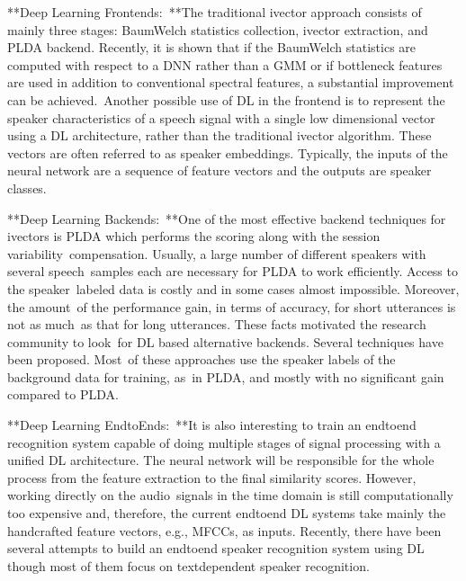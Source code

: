 \documentclass[letterpaper,10pt,english]{jupyterBook}
\begin{document}
\sphinxAtStartPar
**Deep Learning Frontends: **The traditional i\sphinxhyphen{}vector approach consists
of mainly three stages: Baum\sphinxhyphen{}Welch statistics collection, i\sphinxhyphen{}vector
extraction, and PLDA backend. Recently, it is shown that if the
Baum\sphinxhyphen{}Welch statistics are computed with respect to a DNN rather than a
GMM or if bottleneck features are used in addition to conventional
spectral features, a substantial improvement can be achieved. Another
possible use of DL in the frontend is to represent the speaker
characteristics of a speech signal with a single low dimensional vector
using a DL architecture, rather than the traditional i\sphinxhyphen{}vector algorithm.
These vectors are often referred to as speaker embeddings. Typically,
the inputs of the neural network are a sequence of feature vectors and
the outputs are speaker classes.

\sphinxAtStartPar
**Deep Learning Backends: **One of the most effective backend techniques
for i\sphinxhyphen{}vectors is PLDA which performs the scoring along with the session
variability compensation. Usually, a large number of different speakers
with several speech samples each are necessary for PLDA to work
efficiently. Access to the speaker labeled data is costly and in some
cases almost impossible. Moreover, the amount of the performance gain,
in terms of accuracy, for short utterances is not as much as that for
long utterances. These facts motivated the research community to
look for DL based alternative backends. Several techniques have been
proposed. Most of these approaches use the speaker labels of the
background data for training, as in PLDA, and mostly with no significant
gain compared to PLDA.

\sphinxAtStartPar
**Deep Learning End\sphinxhyphen{}to\sphinxhyphen{}Ends: **It is also interesting to train an
end\sphinxhyphen{}to\sphinxhyphen{}end recognition system capable of doing multiple stages of signal
processing with a unified DL architecture. The neural network will be
responsible for the whole process from the feature extraction to the
final similarity scores. However, working directly on the audio signals
in the time domain is still computationally too expensive and,
therefore, the current end\sphinxhyphen{}to\sphinxhyphen{}end DL systems take mainly the handcrafted
feature vectors, e.g., MFCCs, as inputs. Recently, there have been
several attempts to build an end\sphinxhyphen{}to\sphinxhyphen{}end speaker recognition system using
DL though most of them focus on text\sphinxhyphen{}dependent speaker recognition.
\end{document}
